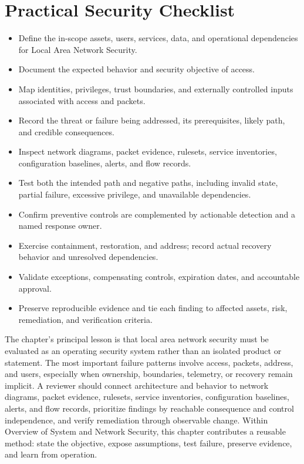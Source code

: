 \documentclass[11pt]{article}
\begin{document}
\section*{Practical Security Checklist}
\begin{itemize}[label=$\square$]
\item Define the in-scope assets, users, services, data, and operational dependencies for Local Area Network Security.
\item Document the expected behavior and security objective of access.
\item Map identities, privileges, trust boundaries, and externally controlled inputs associated with access and packets.
\item Record the threat or failure being addressed, its prerequisites, likely path, and credible consequences.
\item Inspect network diagrams, packet evidence, rulesets, service inventories, configuration baselines, alerts, and flow records.
\item Test both the intended path and negative paths, including invalid state, partial failure, excessive privilege, and unavailable dependencies.
\item Confirm preventive controls are complemented by actionable detection and a named response owner.
\item Exercise containment, restoration, and address; record actual recovery behavior and unresolved dependencies.
\item Validate exceptions, compensating controls, expiration dates, and accountable approval.
\item Preserve reproducible evidence and tie each finding to affected assets, risk, remediation, and verification criteria.
\end{itemize}
\begin{synthesisbox}
The chapter's principal lesson is that local area network security must be evaluated as an operating security system rather than an isolated product or statement. The most important failure patterns involve access, packets, address, and users, especially when ownership, boundaries, telemetry, or recovery remain implicit. A reviewer should connect architecture and behavior to network diagrams, packet evidence, rulesets, service inventories, configuration baselines, alerts, and flow records, prioritize findings by reachable consequence and control independence, and verify remediation through observable change. Within Overview of System and Network Security, this chapter contributes a reusable method: state the objective, expose assumptions, test failure, preserve evidence, and learn from operation.
\end{synthesisbox}
\end{document}
